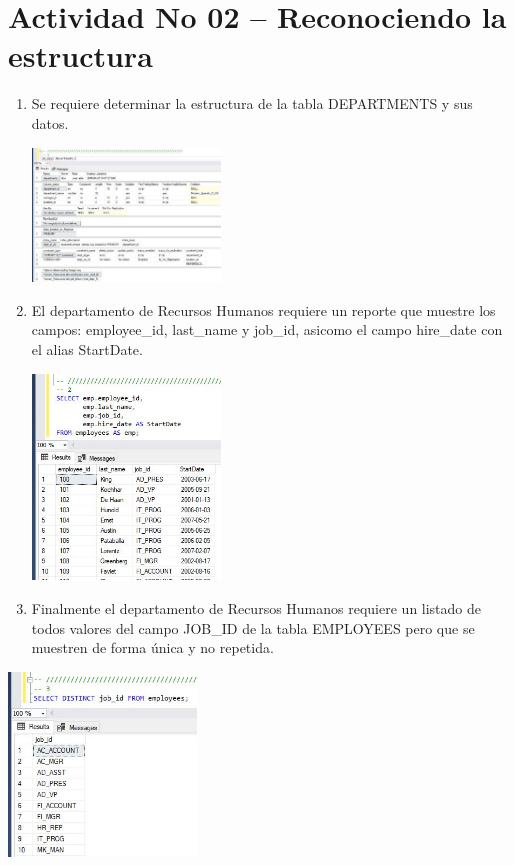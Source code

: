 \section{Actividad No 02 – Reconociendo la estructura} 

\begin{enumerate}[1.]
	\item Se requiere determinar la estructura de la tabla DEPARTMENTS y sus datos.

\begin{itemize}
	\begin{center}
	\includegraphics[width=5cm]{./Imagenes/actividad0201} 
	\end{center}
\end{itemize}

	\item El departamento de Recursos Humanos requiere un reporte que muestre los campos: employee\_id, last\_name y job\_id, asicomo el campo hire\_date con el alias StartDate.

\begin{itemize}
	\begin{center}
	\includegraphics[width=5cm]{./Imagenes/actividad0202} 
	\end{center}
\end{itemize}

	\item Finalmente el departamento de Recursos Humanos requiere un listado de todos valores del campo JOB\_ID de la tabla EMPLOYEES pero que se muestren de forma única y no repetida.
\end{enumerate}

\begin{itemize}
	\begin{center}
	\includegraphics[width=5cm]{./Imagenes/actividad0203} 
	\end{center}
\end{itemize}

